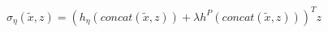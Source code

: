 \documentclass[preview]{standalone}
\begin{document}
\begin{align*}
\sigma_\eta (\tilde x, z) = (h_\eta(concat(\tilde x, z))+\lambda h^P (concat(\tilde x, z)))^T z
\end{align*}
\end{document}
